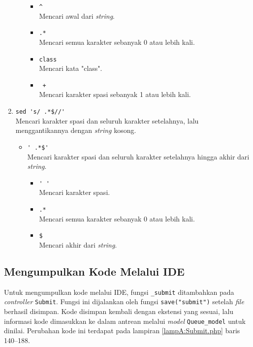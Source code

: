 \begin{enumerate}
\begin{itemize}
        \begin{itemize}
            \item \verb|^| \\ Mencari awal dari \textit{string}.
            \item \verb|.*| \\ Mencari semua karakter sebanyak 0 atau lebih kali.
            \item \verb|class| \\  Mencari kata "class".
             \item \verb| +| \\ Mencari karakter spasi sebanyak 1 atau lebih kali.
        \end{itemize}
    \end{itemize}
    \item \verb|sed 's/ .*$//'| \\ Mencari karakter spasi dan seluruh karakter setelahnya, lalu menggantikannya dengan \textit{string} kosong.
    \begin{itemize}
        \item \verb|' .*$'| \\ Mencari karakter spasi dan seluruh karakter setelahnya hingga akhir dari \textit{string}.
        \begin{itemize}
            \item \verb|' '| \\ Mencari karakter spasi.
            \item \verb|.*| \\ Mencari semua karakter sebanyak 0 atau lebih kali.
            \item \verb|$| \\ Mencari akhir dari \textit{string}.
        \end{itemize}
    \end{itemize}
\end{enumerate}


\subsection{Mengumpulkan Kode Melalui IDE}
\label{subsec:5:kumpul}

Untuk mengumpulkan kode melalui IDE, fungsi \verb|_submit| ditambahkan pada \textit{controller} \verb|Submit|. Fungsi ini dijalankan oleh fungsi \verb|save("submit")| setelah \textit{file} berhasil disimpan. Kode disimpan kembali dengan ekstensi yang sesuai, lalu informasi kode dimasukkan ke dalam antrean melalui \textit{model} \verb|Queue_model| untuk dinilai. Perubahan kode ini terdapat pada lampiran \ref{lampA:Submit.php} baris 140--188.


